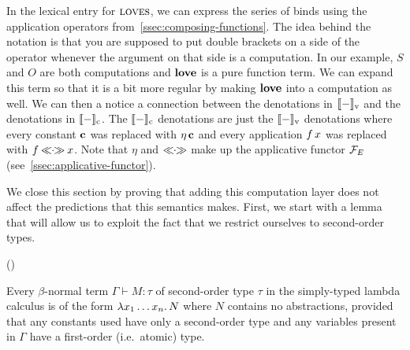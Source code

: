 In the lexical entry for $\textsc{loves}$, we can express the series of binds
using the application operators from~\ref{ssec:composing-functions}. The
idea behind the notation is that you are supposed to put double brackets on
a side of the operator whenever the argument on that side is a
computation. In our example, $S$ and $O$ are both computations and
$\textbf{love}$ is a pure function term. We can expand this term so that it is
a bit more regular by making $\textbf{love}$ into a computation as well. We
can then a notice a connection between the denotations in $\llbracket - \rrbracket_{\mathrm{v}}$
and the denotations in $\llbracket - \rrbracket_{\mathrm{c}}$. The $\llbracket - \rrbracket_{\mathrm{c}}$ denotations
are just the $\llbracket - \rrbracket_{\mathrm{v}}$ denotations where every constant $\textbf{c}$
was replaced with $\eta\,\textbf{c}$ and every application $f\,x$ was
replaced with $f \mathbin{\ll\!\!\cdot\!\!\gg} x$. Note that $\eta$ and $\mathbin{\ll\!\!\cdot\!\!\gg}$ make up the
applicative functor $\mathcal{F}_E$ (see~\ref{ssec:applicative-functor}).

We close this section by proving that adding this computation layer does
not affect the predictions that this semantics makes. First, we start with
a lemma that will allow us to exploit the fact that we restrict ourselves
to second-order types.

\begin{lemma}\label{lem:second-order-no-abstractions}
  ()

  Every $\beta$-normal term $\Gamma \vdash M : \tau$ of second-order type
  $\tau$ in the simply-typed lambda calculus is of the form
  $\lambda x_1 \ldots x_n.\, N$ where $N$ contains no abstractions, provided
  that any constants used have only a second-order type and any variables
  present in $\Gamma$ have a first-order (i.e.\ atomic) type.
\end{lemma}

